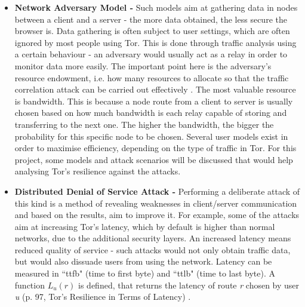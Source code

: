 \documentclass[a4paper, 12pt, titlepage]{article}
\begin{document}
\begin{itemize}
\item{\textbf{Network Adversary Model - }}Such models aim at gathering data in nodes between a client and a server - the more data obtained, the less secure the browser is. Data gathering is often subject to user settings, which are often ignored by most people using Tor. This is done through traffic analysis using a certain behaviour - an adversary would usually act as a relay in order to monitor data more easily. The important point here is the adversary's resource endowment, i.e. how many resources to allocate so that the traffic correlation attack can be carried out effectively \cite{TORAnalysis}. The most valuable resource is bandwidth. This is because a node route from a client to server is usually chosen based on how much bandwidth is each relay capable of storing and transferring to the next one. The higher the bandwidth, the bigger the probability for this specific node to be chosen. Several user models exist in order to maximise efficiency, depending on the type of traffic in Tor. For this project, some models and attack scenarios will be discussed that would help analysing Tor's resilience against the attacks.
\item{\textbf{Distributed Denial of Service Attack - }}Performing a deliberate attack of this kind is a method of revealing weaknesses in client/server communication and based on the results, aim to improve it. For example, some of the attacks aim at increasing Tor's latency, which by default is higher than normal networks, due to the additional security layers. An increased latency means reduced quality of service - such attacks would not only obtain traffic data, but would also dissuade users from using the network. Latency can be measured in ``ttfb" (time to first byte) and ``ttlb" (time to last byte). A function $L_u(r)$ is defined, that returns the latency of route \textit{r} chosen by user \textit{u} (p. 97, Tor's Resilience in Terms of Latency) \cite{TorResilience}.
\end{itemize}
\end{document}
